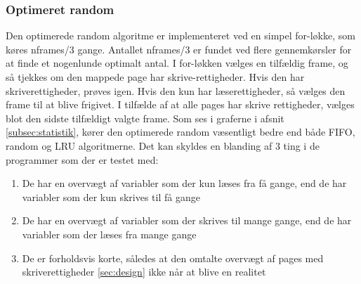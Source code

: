 \subsubsection{Optimeret random}
Den optimerede random algoritme er implementeret ved en simpel for-løkke, som køres nframes/3 gange. Antallet nframes/3 er fundet ved flere gennemkørsler for at finde et nogenlunde optimalt antal. I for-løkken vælges en tilfældig frame, og så tjekkes om den mappede page har skrive-rettigheder. Hvis den har skriverettigheder, prøves igen. Hvis den kun har læserettigheder, så vælges den frame til at blive frigivet. I tilfælde af at alle pages har skrive rettigheder, vælges blot den sidste tilfældigt valgte frame.
Som ses i graferne i afsnit \ref{subsec:statistik}, kører den optimerede random væsentligt bedre end både FIFO, random og LRU algoritmerne. Det kan skyldes en blanding af 3 ting i de programmer som der er testet med: 

\begin{enumerate}
	\item De har en overvægt af variabler som der kun læses fra få gange, end de har variabler som der kun skrives til få gange
	\item De har en overvægt af variabler som der skrives til mange gange, end de har variabler som der læses fra mange gange
	\item De er forholdsvis korte, således at den omtalte overvægt af pages med skriverettigheder \ref{sec:design} ikke når at blive en realitet
\end{enumerate}


